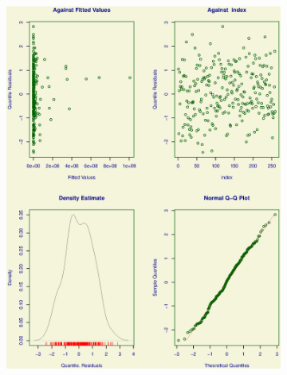 \documentclass{DissertateUSU}
\begin{document}
\begin{figure}
\centering
\begin{subfigure}[b]{0.5\textwidth}
   \includegraphics[width=1\linewidth]{ROC_4Plot_ZAIG.eps}
   \caption{}
   \label{Residuals_ZAIG} 
\end{subfigure}


\end{figure}
\end{document}
